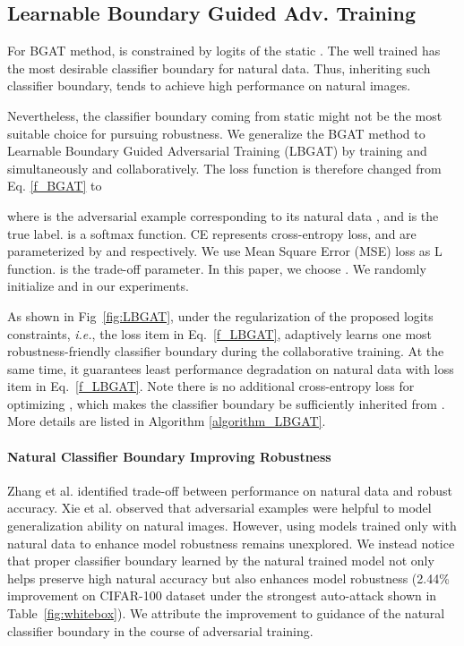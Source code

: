 \documentclass[final]{cvpr}
\begin{document}
\subsection{Learnable Boundary Guided Adv. Training}
\label{sec_LBGAT}
For BGAT method,  is constrained by logits of the static . The well trained  has the most desirable classifier boundary for natural data. Thus, inheriting such classifier boundary,  tends to achieve high performance on natural images. 

Nevertheless, the classifier boundary coming from static  might not be the most suitable choice for pursuing robustness.
We generalize the BGAT method to Learnable Boundary Guided Adversarial Training (LBGAT) by training  and  simultaneously and collaboratively. The loss function is therefore changed from Eq. \eqref{f_BGAT} to
\begin{small}
	
\end{small}
where  is the adversarial example corresponding to its natural data , and  is the true label.  is a softmax function. CE represents cross-entropy loss,  and  are parameterized by  and  respectively. We use Mean Square Error (MSE) loss as L function.  is the trade-off parameter. In this paper, we choose . We randomly initialize  and  in our experiments.

As shown in Fig~\ref{fig:LBGAT}, under the regularization of the proposed logits constraints, {\it i.e.}, the  loss item in Eq.~\eqref{f_LBGAT},  adaptively learns one most robustness-friendly classifier boundary during the collaborative training. At the same time, it guarantees least performance degradation on natural data with  loss item in Eq.~\eqref{f_LBGAT}. Note there is no additional cross-entropy loss for optimizing , which makes the classifier boundary be sufficiently inherited from . More details are listed in Algorithm \ref{algorithm_LBGAT}.

\vspace{-0.1in}
\paragraph{Natural Classifier Boundary Improving Robustness} Zhang et al. \cite{zhang2019theoretically} identified trade-off between performance on natural data and robust accuracy. Xie et al. \cite{xie2020adversarial} observed that adversarial examples were helpful to model generalization ability on natural images. However, using models trained only with natural data to enhance model robustness remains unexplored. We instead notice that proper classifier boundary learned by the natural trained model not only helps preserve high natural accuracy but also enhances model robustness (2.44\% improvement on CIFAR-100 dataset under the strongest auto-attack \cite{croce2020reliable} shown in Table~\ref{fig:whitebox}). We attribute the improvement to guidance of the natural classifier boundary in the course of adversarial training.
\end{document}
